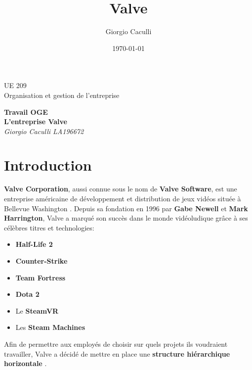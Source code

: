 \documentclass[12pt]{article}
\title{Valve}
\author{Giorgio Caculli}
\date{\today}
\begin{document}
	\begin{titlepage}
		\centering
		\vspace*{\fill}
		\LARGE
		UE 209\\Organisation et gestion de l'entreprise
		\vspace*{\fill}
		\begin{center}
			\Large
			\textbf{Travail OGE\\}
			\Huge
			\textbf{L'entreprise Valve}\\
			\vspace*{0.5cm}
			\large
			\textit{Giorgio Caculli LA196672}
		\end{center}
		\vspace*{\fill}
		\begin{figure}[htbp]
			\centering
			
		\end{figure}
		\vspace*{\fill}
		\thispagestyle{fancy}
	\end{titlepage}

	\newpage
	\tableofcontents
	\thispagestyle{fancy}

	\newpage
	\section{Introduction}
	\textbf{Valve Corporation}, aussi connue sous le nom de \textbf{Valve Software}, est une entreprise américaine de développement et distribution de jeux vidéos située à Bellevue Washington \cite{wikipedia_valve}. Depuis sa fondation en 1996 par \textbf{Gabe Newell} et \textbf{Mark Harrington}, Valve a marqué son succès dans le monde vidéoludique grâce à ses célèbres titres et technologies:
    \begin{itemize}
        \item \textbf{Half-Life 2}
        \item \textbf{Counter-Strike}
        \item \textbf{Team Fortress}
        \item \textbf{Dota 2}
        \item Le \textbf{SteamVR}
        \item Les \textbf{Steam Machines}
    \end{itemize}
    Afin de permettre aux employés de choisir sur quels projets ils voudraient travailler, Valve a décidé de mettre en place une \textbf{structure hiérarchique horizontale} \cite{handbook}.

    \newpage
\end{document}
